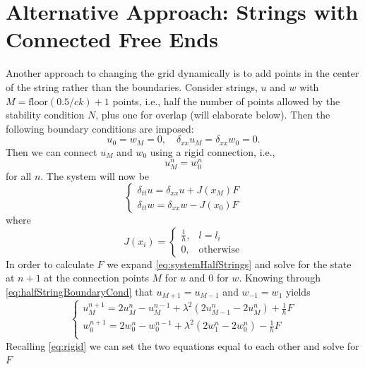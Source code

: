 \documentclass[dvipsnames]{article}
\begin{document}
\section{Alternative Approach: Strings with Connected Free Ends}
Another approach to changing the grid dynamically is to add points in the center of the string rather than the boundaries. Consider strings, $u$ and $w$ with $M = \text{floor}(0.5/ck) + 1$ points, i.e., half the number of points allowed by the stability condition $N$, plus one for overlap (will elaborate below). Then the following boundary conditions are imposed:
\begin{equation}\label{eq:halfStringBoundaryCond}
    u_0 = w_M = 0, \quad \delta_{xx}u_M = \delta_{xx}w_0 = 0.
\end{equation}
Then we can connect $u_M$ and $w_0$ using a rigid connection, i.e.,
\begin{equation}\label{eq:rigid}
    u_M^n = w_0^n
\end{equation}
for all $n$. The system will now be
\begin{equation}
    \begin{cases}\label{eq:systemHalfStrings}
        \delta_{tt}u = \delta_{xx}u + J(x_M)F\\
        \delta_{tt}w = \delta_{xx}w - J(x_0)F
    \end{cases}
\end{equation}
where
\begin{equation}
    J(x_i) =
    \begin{cases}
        \frac{1}{h}, & l = l_i\\
        0,& \text{otherwise}
    \end{cases}
\end{equation}
In order to calculate $F$ we expand \eqref{eq:systemHalfStrings} and solve for the state at $n+1$ at the connection points $M$ for $u$ and $0$ for $w$. Knowing through \eqref{eq:halfStringBoundaryCond} that $u_{M+1} = u_{M-1}$ and $w_{-1} = w_1$   yields
\begin{equation}\label{eq:expandedSystem}
    \begin{cases}
    u^{n+1}_M = 2u_M^n - u_M^{n-1} + \lambda^2(2u_{M-1}^n-2u_M^n) + \frac{1}{h} F\\
    w^{n+1}_0 = 2w_0^n - w_0^{n-1} + \lambda^2(2w_1^n-2w_0^n) - \frac{1}{h} F\\
    \end{cases}
\end{equation}
Recalling \eqref{eq:rigid} we can set the two equations equal to each other and solve for $F$
\end{document}
